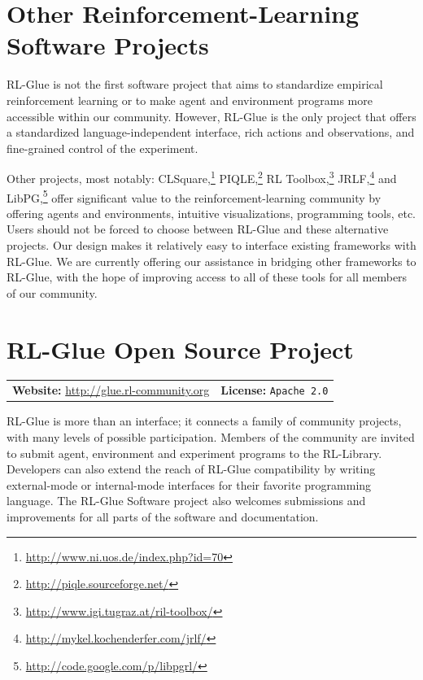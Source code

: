 \documentclass[twoside,11pt]{article}
\begin{document}
\vspace{-0.2cm}
\section{Other Reinforcement-Learning Software Projects}
\vspace{-0.2cm}
RL-Glue is not the first software project that aims to  standardize empirical reinforcement learning or to make agent and environment programs more accessible within our community.  However, RL-Glue is the only project that offers a standardized language-independent interface, rich actions and observations, and fine-grained control of the experiment.

Other projects, most notably: CLSquare,\footnote{\url{http://www.ni.uos.de/index.php?id=70}}  PIQLE,\footnote{\url{http://piqle.sourceforge.net/}} RL Toolbox,\footnote{\url{http://www.igi.tugraz.at/ril-toolbox/}
} JRLF,\footnote{\url{http://mykel.kochenderfer.com/jrlf/}}  and LibPG,\footnote{\url{http://code.google.com/p/libpgrl/}} offer significant value to the reinforcement-learning community by offering agents and environments, intuitive visualizations, programming tools, etc.  Users should not be forced to choose between RL-Glue and these alternative projects. Our design makes it relatively easy to interface existing frameworks with RL-Glue.  We are currently offering our assistance in bridging other frameworks to RL-Glue, with the hope of improving access to all of these tools for all members of our community.

 
\vspace{-0.2cm}
\section{RL-Glue Open Source Project}
\vspace{-0.2cm}
\begin{tabular}{ l l}
  \textbf{Website:} \url{http://glue.rl-community.org}  & \textbf{License:} \texttt{Apache 2.0}  \end{tabular}
\newline
\newline
RL-Glue is more than an interface; it connects a family of community projects, with many levels of possible participation. Members of the community are invited to submit agent, environment and experiment programs to the RL-Library. Developers can also extend the reach of RL-Glue compatibility by writing external-mode or internal-mode interfaces for their favorite programming language.  The RL-Glue Software project also welcomes submissions and improvements for all parts of the software and documentation.  
\end{document}
